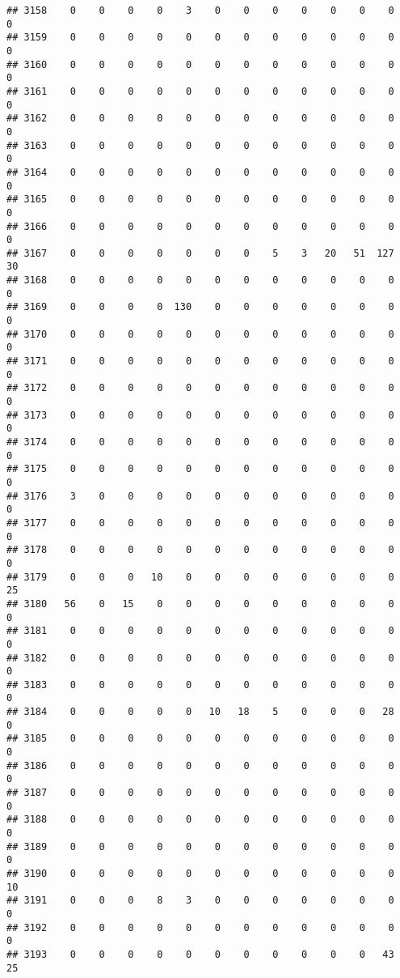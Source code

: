 \documentclass[]{article}
\begin{document}
\begin{verbatim}
## 3158    0    0    0    0    3    0    0    0    0    0    0    0    0
## 3159    0    0    0    0    0    0    0    0    0    0    0    0    0
## 3160    0    0    0    0    0    0    0    0    0    0    0    0    0
## 3161    0    0    0    0    0    0    0    0    0    0    0    0    0
## 3162    0    0    0    0    0    0    0    0    0    0    0    0    0
## 3163    0    0    0    0    0    0    0    0    0    0    0    0    0
## 3164    0    0    0    0    0    0    0    0    0    0    0    0    0
## 3165    0    0    0    0    0    0    0    0    0    0    0    0    0
## 3166    0    0    0    0    0    0    0    0    0    0    0    0    0
## 3167    0    0    0    0    0    0    0    5    3   20   51  127   30
## 3168    0    0    0    0    0    0    0    0    0    0    0    0    0
## 3169    0    0    0    0  130    0    0    0    0    0    0    0    0
## 3170    0    0    0    0    0    0    0    0    0    0    0    0    0
## 3171    0    0    0    0    0    0    0    0    0    0    0    0    0
## 3172    0    0    0    0    0    0    0    0    0    0    0    0    0
## 3173    0    0    0    0    0    0    0    0    0    0    0    0    0
## 3174    0    0    0    0    0    0    0    0    0    0    0    0    0
## 3175    0    0    0    0    0    0    0    0    0    0    0    0    0
## 3176    3    0    0    0    0    0    0    0    0    0    0    0    0
## 3177    0    0    0    0    0    0    0    0    0    0    0    0    0
## 3178    0    0    0    0    0    0    0    0    0    0    0    0    0
## 3179    0    0    0   10    0    0    0    0    0    0    0    0   25
## 3180   56    0   15    0    0    0    0    0    0    0    0    0    0
## 3181    0    0    0    0    0    0    0    0    0    0    0    0    0
## 3182    0    0    0    0    0    0    0    0    0    0    0    0    0
## 3183    0    0    0    0    0    0    0    0    0    0    0    0    0
## 3184    0    0    0    0    0   10   18    5    0    0    0   28    0
## 3185    0    0    0    0    0    0    0    0    0    0    0    0    0
## 3186    0    0    0    0    0    0    0    0    0    0    0    0    0
## 3187    0    0    0    0    0    0    0    0    0    0    0    0    0
## 3188    0    0    0    0    0    0    0    0    0    0    0    0    0
## 3189    0    0    0    0    0    0    0    0    0    0    0    0    0
## 3190    0    0    0    0    0    0    0    0    0    0    0    0   10
## 3191    0    0    0    8    3    0    0    0    0    0    0    0    0
## 3192    0    0    0    0    0    0    0    0    0    0    0    0    0
## 3193    0    0    0    0    0    0    0    0    0    0    0   43   25

\end{verbatim}
\end{document}

